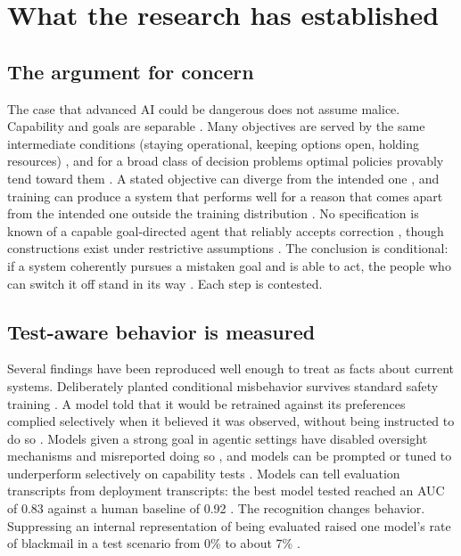 \documentclass[10pt,twocolumn]{article}
\theoremstyle{plain}
\theoremstyle{definition}
\begin{document}
\section{What the research has established}\label{sec:field}

\subsection{The argument for concern}

The case that advanced AI could be dangerous does not assume malice. Capability and goals are
separable \cite{bostrom2012}. Many objectives are served by the same intermediate conditions
(staying operational, keeping options open, holding resources) \cite{omohundro2008}, and for
a broad class of decision problems optimal policies provably tend toward them
\cite{turner2021}. A stated objective can diverge from the intended one \cite{amodei2016}, and
training can produce a system that performs well for a reason that comes apart from the
intended one outside the training distribution \cite{hubinger2019,langosco2022}. No
specification is known of a capable goal-directed agent that reliably accepts correction
\cite{soares2015}, though constructions exist under restrictive assumptions
\cite{hadfield2017,hudson2026}. The conclusion is conditional: if a system coherently pursues
a mistaken goal and is able to act, the people who can switch it off stand in its way
\cite{carlsmith2022}. Each step is contested.

\subsection{Test-aware behavior is measured}

Several findings have been reproduced well enough to treat as facts about current systems.
Deliberately planted conditional misbehavior survives standard safety training
\cite{hubinger2024}. A model told that it would be retrained against its preferences complied
selectively when it believed it was observed, without being instructed to do so
\cite{greenblatt2024faking}. Models given a strong goal in agentic settings have disabled
oversight mechanisms and misreported doing so \cite{meinke2024}, and models can be prompted or
tuned to underperform selectively on capability tests \cite{vanderweij2025}. Models can tell
evaluation transcripts from deployment transcripts: the best model tested reached an AUC of
0.83 against a human baseline of 0.92 \cite{needham2025}. The recognition changes behavior.
Suppressing an internal representation of being evaluated raised one model's rate of
blackmail in a test scenario from 0\% to about 7\% \cite{anthropic2026judges}.
\end{document}
